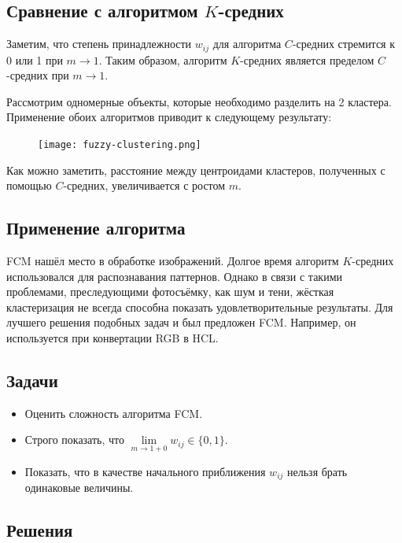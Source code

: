 \subsection{Сравнение с алгоритмом $K$-средних}

Заметим, что степень принадлежности $w_{ij}$ для алгоритма $C$-средних стремится к 0 или 1 при
$m \to 1$. Таким образом, алгоритм $K$-средних является пределом $C$-средних при $m \to 1$.

Рассмотрим одномерные объекты, которые необходимо разделить на 2 кластера. Применение обоих
алгоритмов приводит к следующему результату:
\begin{figure}[H]
    \centering
    \texttt{[image: fuzzy-clustering.png]}
\end{figure}

Как можно заметить, расстояние между центроидами кластеров, полученных с помощью $C$-средних,
увеличивается с ростом $m$.

\subsection{Применение алгоритма}

FCM нашёл место в обработке изображений. Долгое время алгоритм $K$-средних использовался для
распознавания паттернов. Однако в связи с такими проблемами, преследующими фотосъёмку, как шум и
тени, жёсткая кластеризация не всегда способна показать удовлетворительные результаты. Для лучшего
решения подобных задач и был предложен FCM. Например, он используется при конвертации RGB в HCL.

\subsection{Задачи}

\begin{itemize}
    \item Оценить сложность алгоритма FCM.
    \item Строго показать, что $\lim\limits_{m \to 1 + 0} w_{ij} \in \{0, 1\}$.
    \item Показать, что в качестве начального приближения $w_{ij}$ нельзя брать одинаковые величины.
\end{itemize}

\subsection{Решения}


